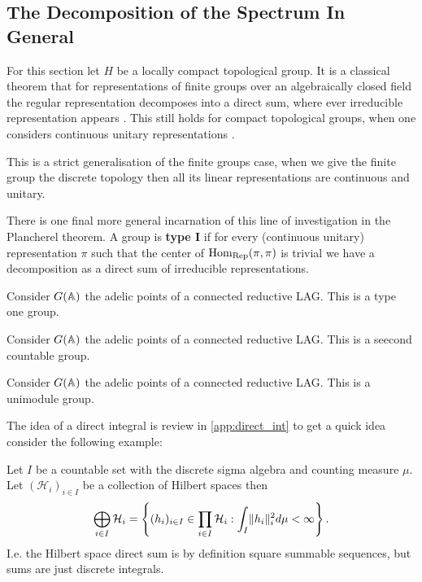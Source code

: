 \subsection{The Decomposition of the Spectrum In General}\label{direct_integral}
For this section let \(H\) be a locally compact topological group.
It is a classical theorem that for representations of finite groups over an algebraically closed field the regular representation decomposes into a direct sum, where ever irreducible representation appears \cite[Ch. 2.4 Cor. 2 ]{LinearRepresentationsFinite}. This still holds for compact topological groups, when one considers continuous unitary representations \cite[5.1]{follandCourseAbstractHarmonic2016}.
\begin{remark}
    This is a strict generalisation of the finite groups case, when we give the finite group the discrete topology then all its linear representations are continuous and unitary.
\end{remark}
There is one final more general incarnation of this line of investigation in the Plancherel theorem. A group is \textbf{type I} if for every (continuous unitary) representation \(\pi\) such that the center of \(\operatorname{Hom}_\mathrm{Rep}(\pi, \pi)\) is trivial we have a decomposition as a  direct sum of irreducible representations. 

\begin{example}
    Consider \(G(\A)\) the adelic points of a connected reductive LAG. This is a type one group. 
\end{example}

\begin{example}
    Consider \(G(\A)\) the adelic points of a connected reductive LAG. This is a seecond countable group. 
\end{example}

\begin{example}
    Consider \(G(\A)\) the adelic points of a connected reductive LAG. This is a unimodule group. 
\end{example}

The idea of a direct integral is review in \ref{app:direct_int} to get a quick idea consider the following example:
\begin{example}
    Let \(I\) be a countable set with the discrete sigma algebra and counting measure \(\mu\). Let \((\mathcal{H}_i)_{i\in I}\) be a collection of Hilbert spaces then
    \[\bigoplus_{i\in I} \mathcal{H}_i = \left\{ (h_i)_{i\in I}\in \prod_{i\in I} \mathcal{H}_i : \int_I \lVert h_i \rVert_i^2 d\mu <\infty \right\}.\]
    I.e. the Hilbert space direct sum is by definition square summable sequences, but sums are just discrete integrals.
\end{example}

